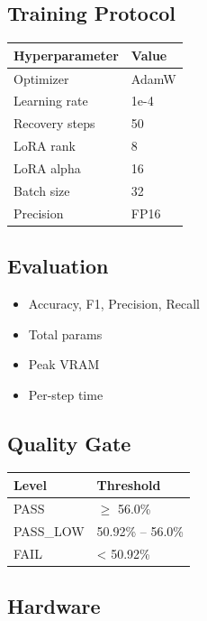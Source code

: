 \subsection{Training Protocol}

\begin{table}[H]
\centering
\small
\begin{tabular}{ll}
\toprule
\textbf{Hyperparameter} & \textbf{Value} \\
\midrule
Optimizer & AdamW \\
Learning rate & 1e-4 \\
Recovery steps & 50 \\
LoRA rank & 8 \\
LoRA alpha & 16 \\
Batch size & 32 \\
Precision & FP16 \\
\bottomrule
\end{tabular}
\end{table}

\subsection{Evaluation}

\begin{itemize}
\item Accuracy, F1, Precision, Recall
\item Total params
\item Peak VRAM
\item Per-step time

\end{itemize}
\subsection{Quality Gate}

\begin{table}[H]
\centering
\small
\begin{tabular}{ll}
\toprule
\textbf{Level} & \textbf{Threshold} \\
\midrule
PASS & $\ge$ 56.0\% \\
PASS\_LOW & 50.92\% -- 56.0\% \\
FAIL & \textless{} 50.92\% \\
\bottomrule
\end{tabular}
\end{table}

\subsection{Hardware}

